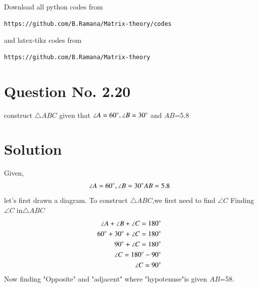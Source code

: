 \documentclass[journal,12pt,twocolumn]{IEEEtran}
\begin{document}
\maketitle
\newpage
\bigskip
\renewcommand{\thefigure}{\theenumi}
\renewcommand{\thetable}{\theenumi}
\newcommand*{\permcomb}[4][0mu]{{{}^{#3}\mkern#1#2_{#4}}}
\newcommand*{\perm}[1][-3mu]{\permcomb[#1]{P}}
\newcommand*{\comb}[1][-1mu]{\permcomb[#1]{C}}
Download all python codes from 
\begin{lstlisting}
https://github.com/B.Ramana/Matrix-theory/codes
\end{lstlisting}
%
and latex-tikz codes from 
%
\begin{lstlisting}
https://github.com/B.Ramana/Matrix-theory
\end{lstlisting}
\section*{Question No. 2.20}
construct $\triangle ABC$ given that $\angle A=60\degree,\angle B=30\degree$ and $AB$=5.8
\section*{Solution}
Given,
\begin{align}
\angle A=60\degree,\angle B=30\degree AB=5.8
\end{align}
let's first drawn a diagram.
To construct $\triangle ABC$,we first need to find $\angle C$
Finding $\angle C$ in$\triangle ABC$
\begin{align}
\angle A+\angle B+\angle C=180\degree\\
60\degree+30\degree+\angle C = 180\degree\\
90\degree+\angle C=180\degree\\
\angle C=180\degree-90\degree\\
\angle C=90\degree    
\end{align}
Now finding "Opposite" and "adjacent" where "hypotenuse"is given $AB$=58.
\end{document}
